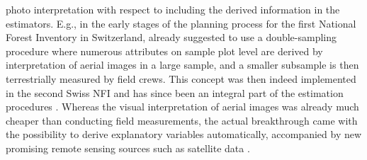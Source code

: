 photo interpretation with respect to including the derived information in the estimators. E.g., in the early stages of the planning process for the first National Forest Inventory in Switzerland, \citet{schmid1970} already suggested to use a double-sampling procedure where numerous attributes on sample plot level are derived by interpretation of aerial images in a large sample, and a smaller subsample is then terrestrially measured by field crews. This concept was then indeed implemented in the second Swiss NFI and has since been an integral part of the estimation procedures \citep{brassel2001}. Whereas the visual interpretation of aerial images was already much cheaper than conducting field measurements, the actual breakthrough came with the possibility to derive explanatory variables automatically, accompanied by new promising remote sensing sources such as satellite data \citep{hildebrandt1987}.\par

